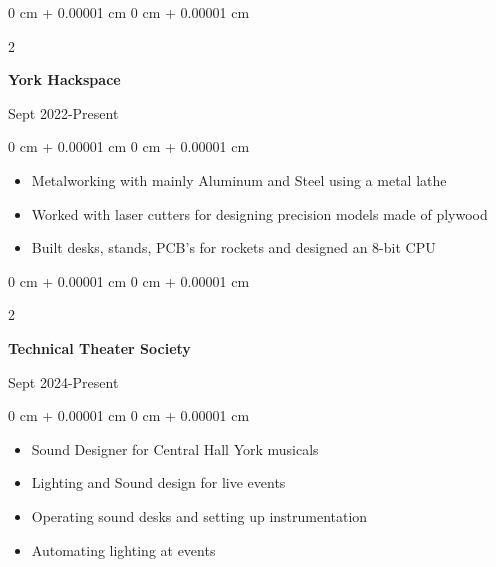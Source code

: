 \documentclass[10pt, letterpaper]{article}
\newenvironment{onecolentry}{
    \begin{adjustwidth}{
        0 cm + 0.00001 cm
    }{
        0 cm + 0.00001 cm
    }
}{
    \end{adjustwidth}
} %
\newenvironment{twocolentry}[2][]{
    \onecolentry
    \def\secondColumn{#2}
    \setcolumnwidth{\fill, 4.5 cm}
    \begin{paracol}{2}
}{
    \switchcolumn \raggedleft \secondColumn
    \end{paracol}
    \endonecolentry
} %
\begin{document}
\begin{samepage}
\begin{samepage}
        \vspace{0.10 cm}
        
        \begin{twocolentry}{
                Sept 2022-Present
            }
                \textbf{York Hackspace}

                \vspace{0.10 cm}
            \end{twocolentry}


            \vspace{0.10 cm}

            \begin{onecolentry}
                \begin{itemize}
                    \item Metalworking with mainly Aluminum and Steel using a metal lathe
                    \item Worked with laser cutters for designing precision models made of plywood
                    \item Built desks, stands, PCB's for rockets and designed an 8-bit CPU
                \end{itemize}
            \end{onecolentry}
        
         \begin{twocolentry}{
              Sept 2024-Present
            }
                \textbf{Technical Theater Society}

                \vspace{0.10 cm}
            \end{twocolentry}


            \vspace{0.10 cm}

            \begin{onecolentry}
                \begin{itemize}
                    \item Sound Designer for Central Hall York musicals
                    \item Lighting and Sound design for live events
                    \item Operating sound desks and setting up instrumentation
                    \item Automating lighting at events 
                \end{itemize}
            \end{onecolentry}


\end{samepage}
\end{samepage}
\end{document}
